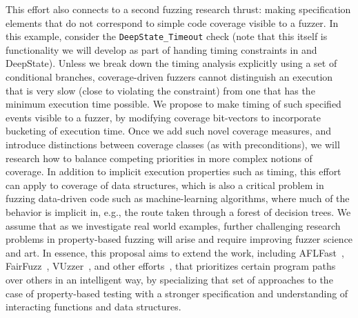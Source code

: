 This effort also connects to a second fuzzing research thrust: making specification elements that do not correspond to simple code coverage visible to a fuzzer.  In this example, consider the {\tt DeepState\_Timeout} check (note that this itself is functionality we will develop as part of handing timing constraints in \framac and DeepState).  Unless we break down the timing analysis explicitly using a set of conditional branches, coverage-driven fuzzers cannot distinguish an execution that is very slow (close to violating the constraint) from one that has the minimum execution time possible.  We propose to make timing of such specified events visible to a fuzzer, by modifying coverage bit-vectors to incorporate bucketing of execution time.  Once we add such novel coverage measures, and introduce distinctions between coverage classes (as with preconditions), we will research how to balance competing priorities in more complex notions of coverage.  In addition to implicit execution properties such as timing, this effort can apply to coverage of data structures, which is also a critical problem in fuzzing data-driven code such as machine-learning algorithms, where much of the behavior is implicit in, e.g., the route taken through a forest of decision trees.  We assume that as we investigate real world examples, further challenging research problems in property-based fuzzing will arise and require improving fuzzer science and art.  In essence, this proposal aims to extend the work, including AFLFast~\cite{aflfast}, FairFuzz~\cite{lemieux2018fairfuzz}, VUzzer~\cite{vuzzer}, and other efforts~\cite{zhao2019send,aschermann2019redqueen}, that prioritizes certain program paths over others in an intelligent way, by specializing that set of approaches to the case of property-based testing with a stronger specification and understanding of interacting functions and data structures.

